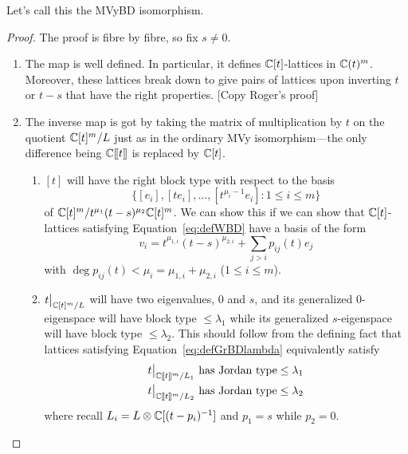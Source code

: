\documentclass{article}
\begin{document}
Let's call this the MVyBD isomorphism.

\begin{proof}
    The proof is fibre by fibre, so fix $s\ne 0$. 
    \begin{enumerate}
        \item The map is well defined. In particular, it defines $\mathbb C[t]$-lattices in $\mathbb C(t)^m$. Moreover, these lattices break down to give pairs of lattices upon inverting $t$ or $t-s$ that have the right properties. [Copy Roger's proof]
        \item The inverse map is got by taking the matrix of multiplication by $t$ on the quotient $\mathbb C[t]^m/L$ just as in the ordinary MVy isomorphism---the only difference being $\mathbb C[\hspace{-.12em}[ {t} ]\hspace{-.12em}]$ is replaced by $\mathbb C[t]$.
\begin{enumerate}
    \item $[t]$ will have the right block type with respect to the basis 
    \begin{equation}
        \{[e_i],[te_i],\dots,[t^{\mu_{i}-1}e_i] : 1\le i \le m\}
    \end{equation}
    of $\mathbb C[t]^m/t^{\mu_1}(t-s)^{\mu_2}\mathbb C[t]^m$. 
    We can show this if we can show that $\mathbb C[t]$-lattices satisfying Equation~\ref{eq:defWBD} have a basis of the form 
    \begin{equation}
        v_i = t^{\mu_{1,i}}(t-s)^{\mu_{2,i}} + \sum_{j>i} p_{ij}(t) e_j 
    \end{equation}
    with $\deg p_{ij}(t) < \mu_i = \mu_{1,i} + \mu_{2,i}$ ($1\le i\le m$).
    \item $t\big|_{\mathbb C[t]^m/L}$ will have two eigenvalues, 0 and $s$, and its generalized 0-eigenspace will have block type $\le \lambda_1$ while its generalized $s$-eigenspace will have block type $\le \lambda_2$. 
    This should follow from the defining fact that lattices satisfying Equation~\ref{eq:defGrBDlambda} equivalently satisfy 
    \begin{equation}
        \begin{split}
            t\big|_{\mathbb C[\hspace{-.12em}[ {t} ]\hspace{-.12em}]^m/L_1}\text{ has Jordan type} \le \lambda_1 \\
            t\big|_{\mathbb C[\hspace{-.12em}[ {t} ]\hspace{-.12em}]^m/L_2}\text{ has Jordan type} \le \lambda_2 
        \end{split}
    \end{equation}
    where recall $L_i = L\otimes \mathbb C[(t-p_i)^{-1}]$ and $p_1 = s$ while $p_2 = 0$. 
\end{enumerate}
    \end{enumerate}
\end{proof}
\end{document}
